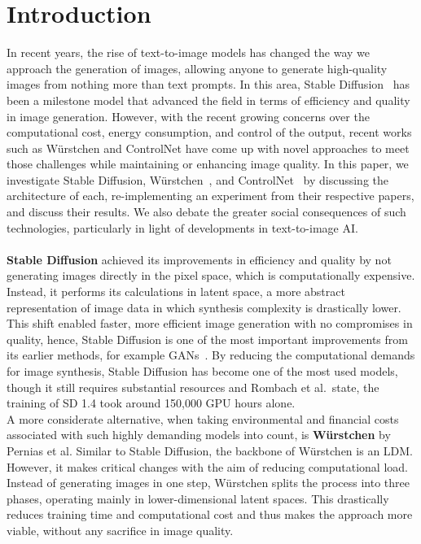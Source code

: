 \section{Introduction}
In recent years, the rise of text-to-image models has changed the way we approach the generation of images, allowing anyone to generate high-quality images from nothing more than text prompts. In this area, Stable Diffusion~\cite{rombach2022stablediffusion} has been a milestone model that advanced the field in terms of efficiency and quality in image generation. However, with the recent growing concerns over the computational cost, energy consumption, and control of the output, recent works such as Würstchen and ControlNet have come up with novel approaches to meet those challenges while maintaining or enhancing image quality. In this paper, we investigate Stable Diffusion, Würstchen~\cite{pernias2024wrstchen}, and ControlNet~\cite{zhang2023addingconditionalcontroltexttoimage} by discussing the architecture of each, re-implementing an experiment from their respective papers, and discuss their results. We also debate the greater social consequences of such technologies, particularly in light of developments in text-to-image AI.
\\
\\
\noindent
\textbf{Stable Diffusion} achieved its improvements in efficiency and quality by not generating images directly in the pixel space, which is computationally expensive. Instead, it performs its calculations in latent space, a more abstract representation of image data in which synthesis complexity is drastically lower. This shift enabled faster, more efficient image generation with no compromises in quality, hence, Stable Diffusion is one of the most important improvements from its earlier methods, for example GANs~\cite{dhariwal2021diffusionmodelsbeatgans}. By reducing the computational demands for image synthesis, Stable Diffusion has become one of the most used models, though it still requires substantial resources and Rombach et al.\ state, the training of SD 1.4 took around 150,000 GPU hours alone.
\\
\noindent
A more considerate alternative, when taking environmental and financial costs associated with such highly demanding models into count, is \textbf{Würstchen} by Pernias et al. Similar to Stable Diffusion, the backbone of Würstchen is an LDM. However, it makes critical changes with the aim of reducing computational load. Instead of generating images in one step, Würstchen splits the process into three phases, operating mainly in lower-dimensional latent spaces. This drastically reduces training time and computational cost and thus makes the approach more viable, without any sacrifice in image quality.
